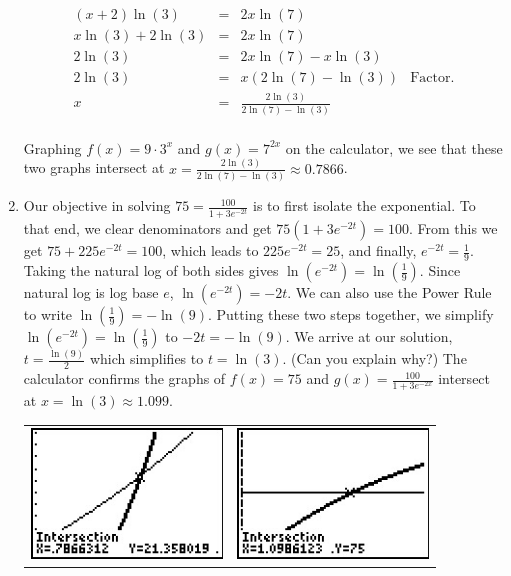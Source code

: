 \begin{ex}
\begin{enumerate}
\[ \begin{array}{rclr}
(x+2) \ln(3) & = & 2x \ln(7) & \\

x \ln(3) + 2 \ln(3) & = & 2x \ln(7) & \\
2 \ln(3) & = & 2x \ln(7) - x \ln(3) & \\
2 \ln(3) & = & x (2 \ln(7) - \ln(3)) & \mbox{Factor.}\\
x & = & \frac{2 \ln(3)}{2\ln(7) - \ln(3)} & \\ [4pt]
\end{array}\]

Graphing $f(x) = 9 \cdot 3^{x}$ and $g(x) = 7^{2x}$ on the calculator, we see that these two graphs intersect at $x = \frac{2 \ln(3)}{2\ln(7) - \ln(3)}  \approx 0.7866$.

\item  Our objective in solving  $75 = \frac{100}{1 + 3e^{-2t}}$ is to first isolate the exponential.  To that end, we clear denominators and get $75\left(1 + 3e^{-2t}\right) = 100$. From this we get $75 + 225e^{-2t} =100$, which leads to  $225e^{-2t} = 25$, and finally, $e^{-2t} = \frac{1}{9}$.    Taking the natural log of both sides gives $\ln\left(e^{-2t}\right) = \ln\left( \frac{1}{9} \right)$.  Since natural log is log base $e$, $\ln\left(e^{-2t}\right) = -2t$.  We can also use the Power Rule to write $\ln\left( \frac{1}{9} \right) = -\ln(9)$.  Putting these two steps together, we simplify $\ln\left(e^{-2t}\right) = \ln\left( \frac{1}{9} \right)$ to   $-2t = -\ln(9)$.  We arrive at our solution, $t = \frac{\ln(9)}{2}$ which simplifies to $t = \ln(3)$. (Can you explain why?)  The calculator confirms the graphs of $f(x) = 75$ and $g(x) = \frac{100}{1 + 3e^{-2x}}$ intersect at $x = \ln(3) \approx 1.099$.

\begin{center}

\begin{tabular}{cc}

\includegraphics[width=2in]{./ExpLogsGraphics/ExpEqns03.jpg} &

\hspace{0.75in} \includegraphics[width=2in]{./ExpLogsGraphics/ExpEqns04.jpg} \\


\end{tabular}
\end{center}
\end{enumerate}
\end{ex}
